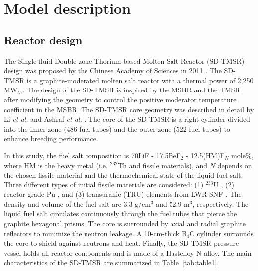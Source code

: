 \section{Model description} \label{Model-description}
\subsection{Reactor design}

The Single-fluid Double-zone Thorium-based Molten Salt Reactor (SD-TMSR) design was proposed by the Chinese Academy of Sciences in 2011 
\cite{li_optimization_2018,jiang2012advanced,li2015analysis,li2017model}. The 
\gls{SD-TMSR} is a graphite-moderated molten salt reactor with a thermal power 
of 2,250 MW$_{th}$. The design of the \gls{SD-TMSR} is inspired by the 
\gls{MSBR} \cite{robertson_conceptual_1971} and the \gls{TMSR} 
\cite{nuttin2005potential} after modifying the geometry to control the 
positive moderator temperature coefficient in the MSBR. The \gls{SD-TMSR} core 
geometry was described in detail by Li \emph{et al.} and Ashraf \emph{et al.}
\cite{li_optimization_2018,ashraf2020whole}. The core of the 
\gls{SD-TMSR} is a right cylinder divided into the inner zone (486 fuel tubes) 
and the outer zone (522 fuel tubes) to enhance breeding performance.

In this study, the fuel salt composition is 70LiF - 17.5BeF$_2$ - 
12.5(HM)F$_N$ mole\%, where HM is the heavy metal (i.e. $^{232}$Th and fissile 
materials), and $N$ depends on the chosen fissile material and the 
thermochemical state of the liquid fuel salt. Three different types of initial 
fissile materials are considered: (1) $^{233}$U \cite{ashraf2020whole}, 
(2) reactor-grade Pu \cite{marka1993explosive}, and (3) transuranic (TRU) 
elements from \gls{LWR} \gls{SNF} \cite{de2000scenarios}.
The density and volume of the fuel salt are 3.3 g/cm$^{3}$ and 52.9 m$^3$, 
respectively. The liquid fuel salt circulates continuously through the fuel 
tubes that pierce the graphite hexagonal prisms. The core is surrounded by 
axial and radial graphite reflectors to minimize the neutron leakage.
A 10-cm-thick B$_4$C cylinder surrounds the core to shield against neutrons and heat.
Finally, the \gls{SD-TMSR} pressure vessel holds all reactor components and is made of 
a Hastelloy N alloy. The main characteristics of the \gls{SD-TMSR} are 
summarized in Table~\ref{tab:table1}.


